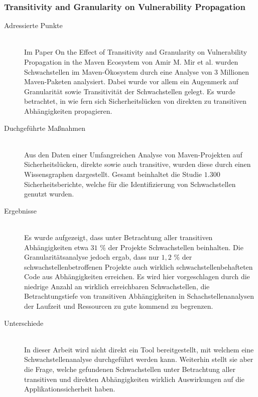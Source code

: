 \subsubsection{Transitivity and Granularity on Vulnerability Propagation} \label{sec:Transitivity}
    \begin{description}
        \item[Adressierte Punkte]\hfill \\
            Im Paper \glqq On the Effect of Transitivity and Granularity on Vulnerability Propagation in the Maven Ecosystem\grqq\textsuperscript{\cite{article:OnTheEffect10123571}} von Amir M. Mir et al. wurden Schwachstellen im Maven-Ökosystem\textsuperscript{\cite{link:Maven}} durch eine Analyse von $3$ Millionen Maven-Paketen analysiert.
            Dabei wurde vor allem ein Augenmerk auf Granularität sowie Transitivität der Schwachstellen gelegt.
            Es wurde betrachtet, in wie fern sich Sicherheitslücken von direkten zu transitiven Abhängigkeiten propagieren.
        \item[Duchgeführte Maßnahmen]\hfill \\
            Aus den Daten einer Umfangreichen Analyse von Maven-Projekten auf Sicherheitslücken, direkte sowie auch transitive, wurden diese durch einen Wissensgraphen dargestellt.
            Gesamt beinhaltet die Studie $1.300$ Sicherheitsberichte, welche für die Identifizierung von Schwachstellen genutzt wurden.
        \item[Ergebnisse]\hfill \\
            Es wurde aufgezeigt, dass unter Betrachtung aller transitiven Abhängigkeiten etwa $31$ \% der Projekte Schwachstellen beinhalten.
            Die Granularitätsanalyse jedoch ergab, dass nur $1,2$ \% der schwachstellenbetroffenen Projekte auch wirklich schwachstellenbehafteten Code aus Abhängig\-keiten erreichen.
            Es wird hier vorgeschlagen durch die niedrige Anzahl an wirklich erreichbaren Schwachstellen, die Betrachtungstiefe von transitiven Abhängigkeiten in Schachstellenanalysen der Laufzeit und Ressourcen zu gute kommend zu begrenzen.
        \item[Unterschiede]\hfill \\
            In dieser Arbeit wird nicht direkt ein Tool bereitgestellt, mit welchem eine Schwachstellenanalyse durchgeführt werden kann.
            Weiterhin stellt sie aber die Frage, welche gefundenen Schwachstellen unter Betrachtung aller transitiven und direkten Abhängigkeiten wirklich Auswirkungen auf die Applikationssicherheit haben.
    \end{description}